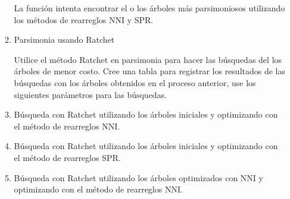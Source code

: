 \begin{itemize}
\begin{enumerate}

La funci\'on  intenta encontrar el o los \'arboles m\'as parsimoniosos utilizando los m\'etodos de rearreglos NNI y SPR.


\item{Parsimonia usando Ratchet} 

Utilice el m\'etodo Ratchet en parsimonia para hacer las b\'usquedas del los \'arboles de menor costo. Cree una tabla para registrar los resultados de las b\'usquedas con los \'arboles obtenidos en el proceso anterior, use los siguientes par\'ametros para las  b\'usquedas.

\item B\'usqueda con Ratchet utilizando los \'arboles iniciales y optimizando con el m\'etodo de rearreglos NNI.


\item B\'usqueda con Ratchet utilizando los \'arboles iniciales y optimizando con el m\'etodo de rearreglos SPR.


\item B\'usqueda con Ratchet utilizando los \'arboles optimizados con NNI y optimizando con el m\'etodo de rearreglos NNI.



\end{enumerate}
\end{itemize}
